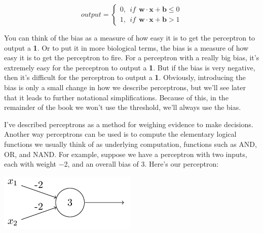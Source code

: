 \documentclass[a4paper,12pt]{report}%
\begin{document}
\begin{center}
 \begin{equation}
  output    =   \begin{cases}
                0, ~~ if ~~ \mathbf{w} \cdot \mathbf{x} + \mathbf{b} \le 0 \\
                1, ~~ if ~~ \mathbf{w} \cdot \mathbf{x} + \mathbf{b} > 1
                \end{cases}
 \end{equation}
\end{center}


You can think of the bias as a measure of how easy it is to get the perceptron to output a \textbf{1}. Or to put it in more biological terms, the bias is a measure of how easy it is to get the perceptron to fire. For a perceptron with a really big bias, it's extremely easy for the perceptron to output a \textbf{1}. But if the bias is very negative, then it's difficult for the perceptron to output a \textbf{1}. Obviously, introducing the bias is only a small change in how we describe perceptrons, but we'll see later that it leads to further notational simplifications. Because of this, in the remainder of the book we won't use the threshold, we'll always use the bias.

I've described perceptrons as a method for weighing evidence to make decisions. Another way perceptrons can be used is to compute the elementary logical functions we usually think of as underlying computation, functions such as AND, OR, and NAND. For example, suppose we have a perceptron with two inputs, each with weight −2, and an overall bias of 3. Here's our perceptron:

\begin{center}
 \includegraphics[width=0.7\linewidth]{images/tikz2.png}
\end{center}
\end{document}
